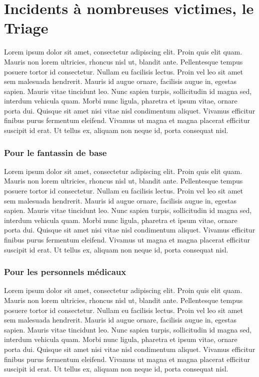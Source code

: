 \documentclass{article}
\begin{document}
	\part{Incidents à nombreuses victimes, le Triage}
		Lorem ipsum dolor sit amet, consectetur adipiscing elit. Proin quis elit quam. Mauris non lorem ultricies, rhoncus nisl ut, blandit ante. Pellentesque tempus posuere tortor id consectetur. Nullam eu facilisis lectus. Proin vel leo sit amet sem malesuada hendrerit. Mauris id augue ornare, facilisis augue in, egestas sapien. Mauris vitae tincidunt leo. Nunc sapien turpis, sollicitudin id magna sed, interdum vehicula quam. Morbi nunc ligula, pharetra et ipsum vitae, ornare porta dui. Quisque sit amet nisi vitae nisl condimentum aliquet. Vivamus efficitur finibus purus fermentum eleifend. Vivamus ut magna et magna placerat efficitur suscipit id erat. Ut tellus ex, aliquam non neque id, porta consequat nisl.
		
		\section{Pour le fantassin de base}
			Lorem ipsum dolor sit amet, consectetur adipiscing elit. Proin quis elit quam. Mauris non lorem ultricies, rhoncus nisl ut, blandit ante. Pellentesque tempus posuere tortor id consectetur. Nullam eu facilisis lectus. Proin vel leo sit amet sem malesuada hendrerit. Mauris id augue ornare, facilisis augue in, egestas sapien. Mauris vitae tincidunt leo. Nunc sapien turpis, sollicitudin id magna sed, interdum vehicula quam. Morbi nunc ligula, pharetra et ipsum vitae, ornare porta dui. Quisque sit amet nisi vitae nisl condimentum aliquet. Vivamus efficitur finibus purus fermentum eleifend. Vivamus ut magna et magna placerat efficitur suscipit id erat. Ut tellus ex, aliquam non neque id, porta consequat nisl.
			
		\section{Pour les personnels médicaux}
			Lorem ipsum dolor sit amet, consectetur adipiscing elit. Proin quis elit quam. Mauris non lorem ultricies, rhoncus nisl ut, blandit ante. Pellentesque tempus posuere tortor id consectetur. Nullam eu facilisis lectus. Proin vel leo sit amet sem malesuada hendrerit. Mauris id augue ornare, facilisis augue in, egestas sapien. Mauris vitae tincidunt leo. Nunc sapien turpis, sollicitudin id magna sed, interdum vehicula quam. Morbi nunc ligula, pharetra et ipsum vitae, ornare porta dui. Quisque sit amet nisi vitae nisl condimentum aliquet. Vivamus efficitur finibus purus fermentum eleifend. Vivamus ut magna et magna placerat efficitur suscipit id erat. Ut tellus ex, aliquam non neque id, porta consequat nisl.			
	
	\newpage
	
	\tableofcontents
	
\end{document}
